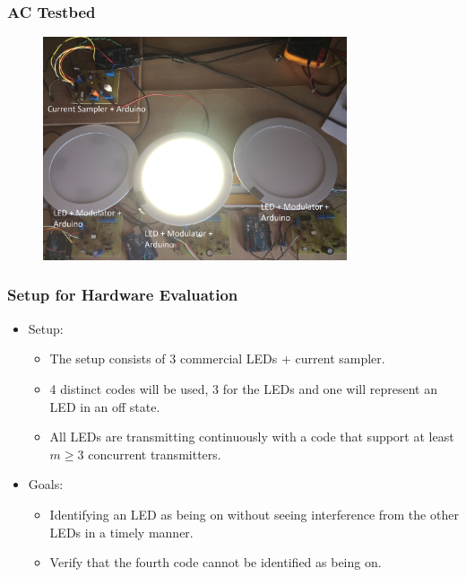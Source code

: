 \documentclass{beamer}
\begin{document}
	\begin{frame}\frametitle{AC Testbed}
		
		\begin{figure}
			\centering
			\includegraphics[width=0.8\textwidth]{../chapters/hardware-chapters/AC/ac-test-bed/ac-test-bed-picture}
		\end{figure}

	\end{frame}




	\begin{frame}\frametitle{Setup for Hardware Evaluation}
		
		

		\begin{itemize}

			\item Setup: 
			\begin{itemize}
				\item The setup consists of 3 commercial LEDs + current sampler.

				\item 4 distinct codes will be used, 3 for the LEDs and one will represent an LED in an off state.

				\item All LEDs are transmitting continuously with a code that support at least $m \ge 3$ concurrent transmitters.
			\end{itemize}

			\item Goals:
			\begin{itemize}
				\item Identifying an LED as being on without seeing interference from the other LEDs in a timely manner.

				\item Verify that the fourth code cannot be identified as being on. 

			\end{itemize}



		\end{itemize}
	\end{frame}
\end{document}
